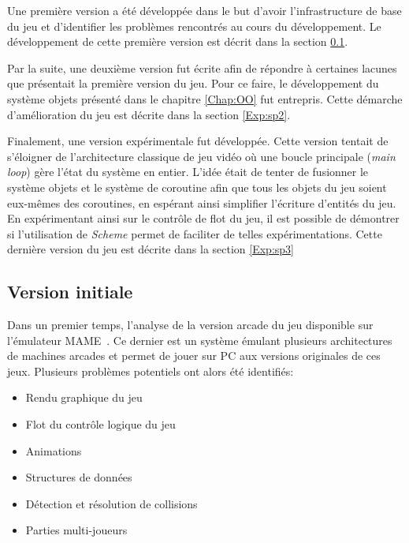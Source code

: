 \documentclass[12pt,twoside,letterpaper,francais]{book}
\newcommand{\Schemelang}{{\textit{Scheme }}}
\begin{document}
Une première version a été développée dans le but d'avoir
l'infrastructure de base du jeu et d'identifier les problèmes
rencontrés au cours du développement. Le développement de cette
première version est décrit dans la section \ref{Exp:sp1}.

Par la suite, une deuxième version fut écrite afin de répondre à
certaines lacunes que présentait la première version du jeu. Pour ce
faire, le développement du système objets présenté dans le chapitre
\ref{Chap:OO} fut entrepris. Cette démarche d'amélioration du jeu est
décrite dans la section \ref{Exp:sp2}.

Finalement, une version expérimentale fut développée. Cette version
tentait de s'éloigner de l'architecture classique de jeu vidéo où une
boucle principale (\textit{main loop}) gère l'état du système en
entier. L'idée était de tenter de fusionner le système objets et le
système de coroutine afin que tous les objets du jeu soient eux-mêmes
des coroutines, en espérant ainsi simplifier l'écriture d'entités du
jeu. En expérimentant ainsi sur le contrôle de flot du jeu, il est
possible de démontrer si l'utilisation de \Schemelang permet de faciliter
de telles expérimentations. Cette dernière version du jeu est décrite
dans la section \ref{Exp:sp3}


\FloatBarrier
\subsection{Version initiale} \label{Exp:sp1}
Dans un premier temps, l'analyse de la version arcade du jeu
disponible sur l'émulateur MAME~\cite{MAME}. Ce dernier est un système
émulant plusieurs architectures de machines arcades et permet de jouer
sur PC aux versions originales de ces jeux. Plusieurs problèmes
potentiels ont alors été identifiés:

\begin{itemize}
\item Rendu graphique du jeu
\item Flot du contrôle logique du jeu
\item Animations
\item Structures de données
\item Détection et résolution de collisions
\item Parties multi-joueurs
\end{itemize}


\FloatBarrier
\end{document}
